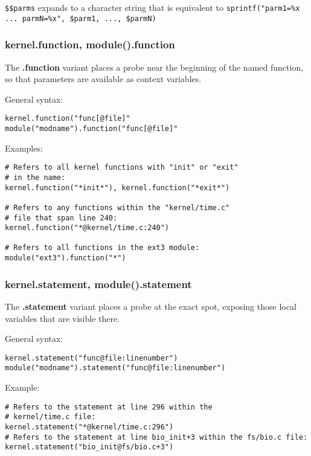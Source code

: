 \documentclass[twoside,english]{article}
\newenvironment{vindent}
{\begin{list}{}{\setlength{\listparindent}{6pt}}
\item[]}
{\end{list}}
\begin{document}
\texttt{\$\$parms} expands to a character string that is equivalent to
\texttt{sprintf("parm1=\%x ... parmN=\%x", \$parm1, ..., \$parmN)}


\subsubsection{kernel.function, module().function}
The \textbf{.function} variant places a probe near the beginning of the named function,
so that parameters are available as context variables.

General syntax:

\begin{vindent}
\begin{verbatim}
kernel.function("func[@file]"
module("modname").function("func[@file]"
\end{verbatim}
\end{vindent}
Examples:

\begin{vindent}
\begin{verbatim}
# Refers to all kernel functions with "init" or "exit"
# in the name:
kernel.function("*init*"), kernel.function("*exit*")

# Refers to any functions within the "kernel/time.c"
# file that span line 240:
kernel.function("*@kernel/time.c:240")

# Refers to all functions in the ext3 module:
module("ext3").function("*")
\end{verbatim}
\end{vindent}

\subsubsection{kernel.statement, module().statement}
The \textbf{.statement} variant places a probe at the exact spot, exposing those local
variables that are visible there.

General syntax:

\begin{vindent}
\begin{verbatim}
kernel.statement("func@file:linenumber")
module("modname").statement("func@file:linenumber")
\end{verbatim}
\end{vindent}
Example:

\begin{vindent}
\begin{verbatim}
# Refers to the statement at line 296 within the
# kernel/time.c file:
kernel.statement("*@kernel/time.c:296")
# Refers to the statement at line bio_init+3 within the fs/bio.c file:
kernel.statement("bio_init@fs/bio.c+3")
\end{verbatim}
\end{vindent}
\end{document}
